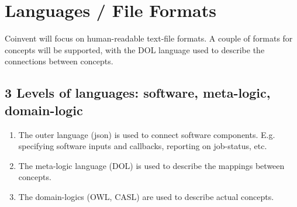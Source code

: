 \documentclass[10pt]{article}
\begin{document}





\section{Languages / File Formats}\label{sec:languages}

Coinvent will focus on human-readable text-file formats. 
A couple of formats for concepts will be supported, with the DOL language used to describe the connections between concepts.

\subsection{3 Levels of languages: software, meta-logic, domain-logic}
\begin{enumerate}
\item The outer language (json) is used to connect software components. E.g. specifying software inputs and callbacks, reporting on job-status, etc.
\item The meta-logic language (DOL) is used to describe the mappings between concepts.
\item The domain-logics (OWL, CASL) are used to describe actual concepts.
\end{enumerate}
\end{document}
